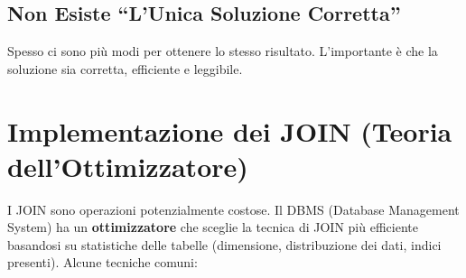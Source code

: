 \subsection{Non Esiste ``L'Unica Soluzione Corretta''}
Spesso ci sono più modi per ottenere lo stesso risultato. L'importante è che la soluzione sia corretta, efficiente e leggibile.

\section{Implementazione dei JOIN (Teoria dell'Ottimizzatore)}
I JOIN sono operazioni potenzialmente costose. Il DBMS (Database Management System) ha un \textbf{ottimizzatore} che sceglie la tecnica di JOIN più efficiente basandosi su statistiche delle tabelle (dimensione, distribuzione dei dati, indici presenti). Alcune tecniche comuni:


